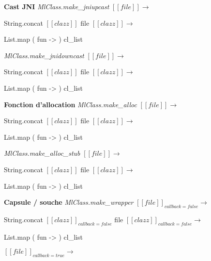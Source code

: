 \documentclass[a4paper, 11pt]{report}
\begin{document}
\textbf{Cast JNI}
\emph{MlClass.make\_jniupcast}
\newline
$[\![ file ]\!]$$\longrightarrow$

String.concat $[\![ clazz ]\!]$ file
\newline
$[\![ clazz ]\!]$$\longrightarrow$

\begin{OCaml}
     List.map ( fun ->  ) cl_list
\end{OCaml}


\emph{MlClass.make\_jnidowncast}
\newline
$[\![ file ]\!]$$\longrightarrow$

String.concat $[\![ clazz ]\!]$ file
\newline
$[\![ clazz ]\!]$$\longrightarrow$

\begin{OCaml}
     List.map ( fun ->  ) cl_list
\end{OCaml}

\textbf{Fonction d'allocation}
\emph{MlClass.make\_alloc}
\newline
$[\![ file ]\!]$$\longrightarrow$

String.concat $[\![ clazz ]\!]$ file
\newline
$[\![ clazz ]\!]$$\longrightarrow$

\begin{OCaml}
     List.map ( fun ->  ) cl_list
\end{OCaml}


\emph{MlClass.make\_alloc\_stub}
\newline
$[\![ file ]\!]$$\longrightarrow$

String.concat $[\![ clazz ]\!]$ file
\newline
$[\![ clazz ]\!]$$\longrightarrow$

\begin{OCaml}
     List.map ( fun ->  ) cl_list
\end{OCaml}

\textbf{Capsule / souche}
\emph{MlClass.make\_wrapper}
\newline
$[\![ file ]\!]_{callback=false}$$\longrightarrow$

String.concat $[\![ clazz ]\!]_{callback=false}$ file
\newline
$[\![ clazz ]\!]_{callback=false}$$\longrightarrow$

\begin{OCaml}
     List.map ( fun ->  ) cl_list
\end{OCaml}
$[\![ file ]\!]_{callback=true}$$\longrightarrow$
\end{document}

